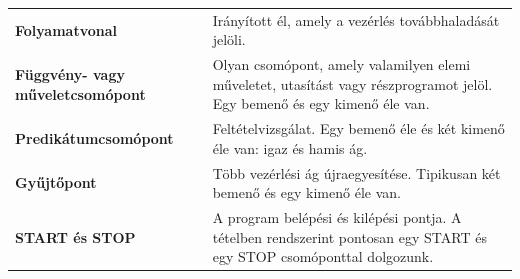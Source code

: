 \begin{tabularx}{\textwidth}{>{\bfseries}lX}
Folyamatvonal & Irányított él, amely a vezérlés továbbhaladását jelöli. \\
Függvény- vagy műveletcsomópont & Olyan csomópont, amely valamilyen elemi műveletet, utasítást vagy részprogramot jelöl. Egy bemenő és egy kimenő éle van. \\
Predikátumcsomópont & Feltételvizsgálat. Egy bemenő éle és két kimenő éle van: igaz és hamis ág. \\
Gyűjtőpont & Több vezérlési ág újraegyesítése. Tipikusan két bemenő és egy kimenő éle van. \\
START és STOP & A program belépési és kilépési pontja. A tételben rendszerint pontosan egy START és egy STOP csomóponttal dolgozunk. \\
\end{tabularx}
